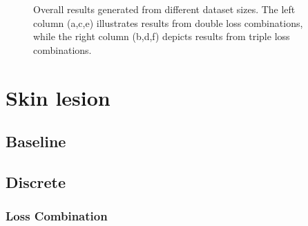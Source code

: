 \begin{figure}[H]
    \caption[Overall results for different dataset sizes]{Overall results generated from different dataset sizes. The left column (a,c,e) illustrates results from double loss combinations, while the right column (b,d,f) depicts results from triple loss combinations.}
    \label{ablation_medaka_heatmaps}
\end{figure}
\newpage

\section{Skin lesion}
\label{sec:supplementary_skin_lesion}
\subsection{Baseline}
\label{subsec:baseline_skin_lesion}

\newpage

\subsection{Discrete}
\label{subsec:discrete_skin_lesion}

\subsubsection*{Loss Combination}


